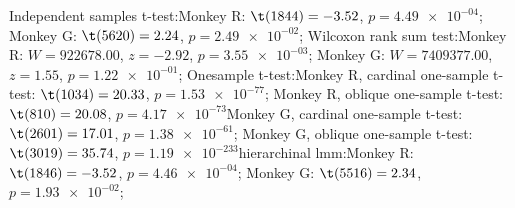 Independent samples t-test:Monkey R: $\t(1844) = -3.52$, $p = \num{4.49e-04}$; 
Monkey G: $\t(5620) = 2.24$, $p = \num{2.49e-02}$; 
Wilcoxon rank sum test:Monkey R: $W = 922678.00$, $z = -2.92$, $p = \num{3.55e-03}$; 
Monkey G: $W = 7409377.00$, $z = 1.55$, $p = \num{1.22e-01}$; 
Onesample t-test:Monkey R, cardinal one-sample t-test: $\t(1034) = 20.33$, $p = \num{1.53e-77}$; 
Monkey R, oblique one-sample t-test: $\t(810) = 20.08$, $p = \num{4.17e-73}$Monkey G, cardinal one-sample t-test: $\t(2601) = 17.01$, $p = \num{1.38e-61}$; 
Monkey G, oblique one-sample t-test: $\t(3019) = 35.74$, $p = \num{1.19e-233}$hierarchinal lmm:Monkey R: $\t(1846) = -3.52$, $p = \num{4.46e-04}$; 
Monkey G: $\t(5516) = 2.34$, $p = \num{1.93e-02}$; 
